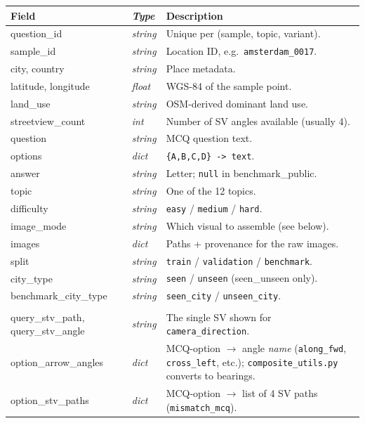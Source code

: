 \documentclass[11pt,a4paper]{article}
\begin{document}
\renewcommand{\arraystretch}{1.15}
\begin{tabularx}{\linewidth}{@{}>{\ttfamily\small}l>{\itshape\small}l X@{}}
\toprule
\textnormal{\textbf{Field}}      & \textbf{Type}   & \textbf{Description} \\
\midrule
question\_id      & string  & Unique per (sample, topic, variant). \\
sample\_id        & string  & Location ID, e.g.\ \texttt{amsterdam\_0017}. \\
city, country     & string  & Place metadata. \\
latitude, longitude & float & WGS-84 of the sample point. \\
land\_use         & string  & OSM-derived dominant land use. \\
streetview\_count & int     & Number of SV angles available (usually 4). \\
question          & string  & MCQ question text. \\
options           & dict    & \texttt{\{A,B,C,D\} -> text}. \\
answer            & string  & Letter; \texttt{null} in benchmark\_public. \\
topic             & string  & One of the 12 topics. \\
difficulty        & string  & \texttt{easy} / \texttt{medium} / \texttt{hard}. \\
image\_mode       & string  & Which visual to assemble (see below). \\
images            & dict    & Paths + provenance for the raw images. \\
split             & string  & \texttt{train} / \texttt{validation} / \texttt{benchmark}. \\
city\_type        & string  & \texttt{seen} / \texttt{unseen} (seen\_unseen only). \\
benchmark\_city\_type & string & \texttt{seen\_city} / \texttt{unseen\_city}. \\
\midrule
\multicolumn{3}{l}{\textit{Topic-specific fields:}} \\
query\_stv\_path, query\_stv\_angle  & string & The single SV shown for \texttt{camera\_direction}. \\
option\_arrow\_angles                & dict   & MCQ-option $\rightarrow$ angle \emph{name} (\texttt{along\_fwd}, \texttt{cross\_left}, etc.); \texttt{composite\_utils.py} converts to bearings. \\
option\_stv\_paths                   & dict   & MCQ-option $\rightarrow$ list of 4 SV paths (\texttt{mismatch\_mcq}). \\

\end{tabularx}
\end{document}
